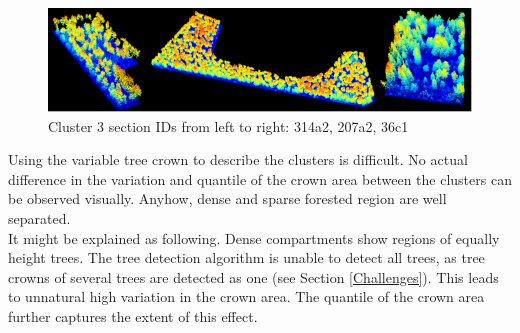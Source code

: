 \begin{figure}[H]
  \includegraphics[width=\textwidth]{cluster3_lidar.png}
  \caption{ Cluster 3 section IDs from left to right: 314a2, 207a2, 36c1}
  \label{fig:LiDAR Cluster 3}
\end{figure}

Using the variable tree crown to describe the clusters is difficult. No actual difference in the variation and quantile
of the crown area between the clusters can be observed visually. Anyhow, dense and sparse
forested region are well separated.\\

It might be explained as following. Dense compartments show regions of equally height trees. The tree detection
algorithm is unable to detect all trees, as tree crowns of several trees are detected as one (see Section \ref{Challenges}). This
leads to unnatural high variation in the crown area. The quantile of the crown area further captures the extent of
this effect.

